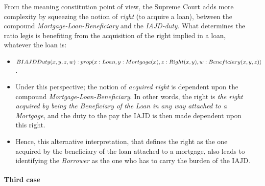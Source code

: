 			From the meaning constitution point of view, the Supreme Court adds more complexity by squeezing the notion of \textit{right} (to acquire a loan), between the compound \textit{Mortgage-Loan-Beneficiary} and the \textit{IAJD-duty}. What determines the ratio legis is benefiting from the acquisition of the right implied in a loan, whatever the loan is:
				\begin{itemize}
					\item $BIAJDDuty(x,y,z,w): prop (x: Loan, \\ y: Mortgage(x), z: Right(x,y), w: Beneficiary\index{beneficiary}(x,y,z))$. 
					\item Under this perspective; the notion of \textit{acquired right} is dependent upon the compound \textit{Mortgage-Loan-Beneficiary}. In other words, the right is \textit{the right acquired by being the Beneficiary of the Loan in any way attached to a Mortgage}, and the duty to the pay the IAJD is then made dependent upon this right.
					\item Hence, this alternative interpretation, that defines the right as the one acquired by the beneficiary of the loan attached to a mortgage, also leads to identifying the \textit{Borrower} as the one who has to carry the burden of the IAJD.
				\end{itemize}
				
			\paragraph{Third case}	
				
